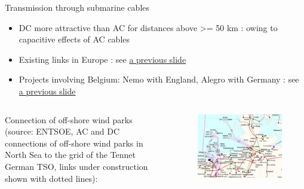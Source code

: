 \begin{frame}{Transmission through submarine cables}
\begin{itemize}
\item DC more attractive than AC for distances above >= 50 km : owing to capacitive effects of AC cables
\item Existing links in Europe : see \href{https://www.elia.be/fr/donnees-de-reseau/transport/flux-physiques-sur-le-reseau-haute-tension-belge}{a previous slide}
\item Projects involving Belgium: Nemo with England, Alegro with Germany : see \href{https://www.elia.be/fr/donnees-de-reseau/transport/flux-physiques-sur-le-reseau-haute-tension-belge}{a previous slide}
\end{itemize}
\begin{columns}
Connection of off-shore wind parks (source: ENTSOE, AC and DC connections of off-shore wind parks in North Sea to the grid of the Tennet German TSO, links under construction shown with dotted lines):
\begin{figure}
\centering
\includegraphics[width=0.6\linewidth]{images/DC_cable.png}
\end{figure}
\end{columns}
\end{frame}

